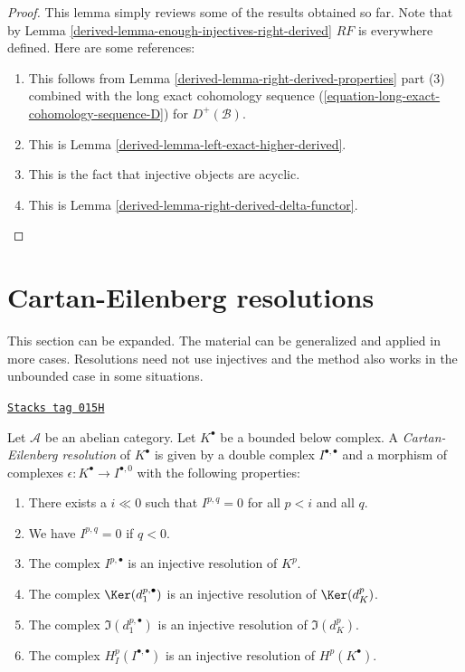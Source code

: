 \begin{proof}

This lemma simply reviews some of the results obtained so far.
Note that by
Lemma \ref{derived-lemma-enough-injectives-right-derived}
$RF$ is everywhere defined. Here are some references:
\begin{enumerate}
\item This follows from
Lemma \ref{derived-lemma-right-derived-properties} part (3)
combined with the long exact cohomology sequence
(\ref{equation-long-exact-cohomology-sequence-D}) for
$D^{+}(\mathcal{B})$.
\item This is
Lemma \ref{derived-lemma-left-exact-higher-derived}.
\item This is the fact that injective objects are acyclic.
\item This is
Lemma \ref{derived-lemma-right-derived-delta-functor}.
\end{enumerate}
\end{proof}

\section{Cartan-Eilenberg resolutions}
\label{derived-section-cartan-eilenberg}
This section can be expanded. The material can be generalized and applied in
more cases. Resolutions need not use injectives and the method also
works in the unbounded case in some situations.

\begin{definition}
\label{derived-definition-cartan-eilenberg}
\href{https://stacks.math.columbia.edu/tag/015H}{\texttt{Stacks tag 015H}}

Let $\mathcal{A}$ be an abelian category.
Let $K^\bullet$ be a bounded below complex.
A {\it Cartan-Eilenberg resolution} of $K^\bullet$
is given by a double complex $I^{\bullet, \bullet}$
and a morphism of complexes $\epsilon : K^\bullet \to I^{\bullet, 0}$
with the following properties:
\begin{enumerate}
\item There exists a $i \ll 0$ such that $I^{p, q} = 0$ for all $p < i$
and all $q$.
\item We have $I^{p, q} = 0$ if $q < 0$.
\item The complex $I^{p, \bullet}$ is an injective resolution of $K^p$.
\item The complex $\Ker(d_1^{p, \bullet})$ is an injective resolution
of $\Ker(d_K^p)$.
\item The complex $\Im(d_1^{p, \bullet})$ is an injective resolution
of $\Im(d_K^p)$.
\item The complex $H^p_I(I^{\bullet, \bullet})$ is an injective resolution
of $H^p(K^\bullet)$.
\end{enumerate}
\end{definition}

